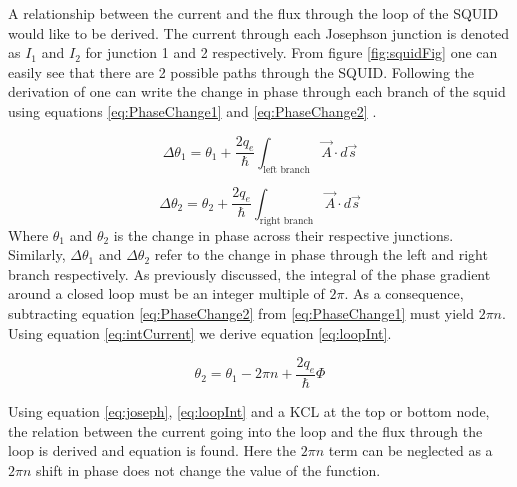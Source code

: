 A relationship between the current and the flux through the loop of the SQUID would like to be derived. The current through each Josephson junction is denoted as $I_1$ and $I_2$ for junction 1 and 2 respectively. From figure \ref{fig:squidFig} one can easily see that there are 2 possible paths through the SQUID. Following the derivation of \cite{Feynman_Leighton_Sands_2013} one can write the change in phase through each branch of the squid using equations \ref{eq:PhaseChange1} and \ref{eq:PhaseChange2} \cite{Feynman_Leighton_Sands_2013}.

\begin{equation}
    \Delta\theta_{1} = \theta_1 + \frac{2q_e}{\hbar}\int_{\text{left branch}} \Vec{A}\cdot d\Vec{s}
    \label{eq:PhaseChange1}
\end{equation}

\begin{equation}
    \Delta\theta_{2} = \theta_2 + \frac{2q_e}{\hbar}\int_{\text{right branch}} \Vec{A}\cdot d\Vec{s}
    \label{eq:PhaseChange2}
\end{equation}
Where $\theta_1$ and $\theta_2$ is the change in phase across their respective junctions. Similarly, $\Delta\theta_1$ and $\Delta\theta_2$ refer to the change in phase through the left and right branch respectively. As previously discussed, the integral of the phase gradient around a closed loop must be an integer multiple of $2\pi$. As a consequence, subtracting equation \ref{eq:PhaseChange2} from \ref{eq:PhaseChange1} must yield $2\pi n$. Using equation \ref{eq:intCurrent} we derive equation \ref{eq:loopInt}.

\begin{equation}
    \theta_2  = \theta_1 - 2\pi n + \frac{2q_e}{\hbar}\Phi
    \label{eq:loopInt}
\end{equation}

Using equation \ref{eq:joseph}, \ref{eq:loopInt} and a KCL at the top or bottom node, the relation between the current going into the loop and the flux through the loop is derived and equation is found. Here the $2\pi n$ term can be neglected as a $2\pi n$ shift in phase does not change the value of the function. 

